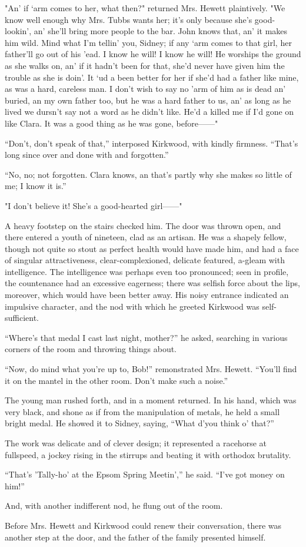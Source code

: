 {\protect\hypertarget{42}{}{}}"An' if `arm comes to her, what then?"
returned Mrs. Hewett plaintively. "We know well enough why Mrs. Tubbs
wants her; it's only because she's good-lookin', an' she'll bring more
people to the bar. John knows that, an' it makes him wild. Mind what I'm
tellin' you, Sidney; if any `arm comes to that girl, her father'll go
out of his 'ead. I know he will! I know he will! He worships the ground
as she walks on, an' if it hadn't been for that, she'd never have given
him the trouble as she is doin'. It `ud a been better for her if she'd
had a father like mine, as was a hard, careless man. I don't wish to say
no 'arm of him as is dead an' buried, an my own father too, but he was a
hard father to us, an' as long as he lived we dursn't say not a word as
he didn't like. He'd a killed me if I'd gone on like Clara. It was a
good thing as he was gone, before{{------}}"

``Don't, don't speak of that,'' interposed Kirkwood, with kindly
firmness. ``That's long since over and done with and forgotten.''

{\protect\hypertarget{43}{}{}}``No, no; not forgotten. Clara knows, an
that's partly why she makes so little of me; I know it is.''

"I don't believe it! She's a good-hearted girl{{------}}"

A heavy footstep on the stairs checked him. The door was thrown open,
and there entered a youth of nineteen, clad as an artisan. He was a
shapely fellow, though not quite so stout as perfect health would have
made him, and had a face of singular attractiveness, clear-complexioned,
delicate featured, a-gleam with intelligence. The intelligence was
perhaps even too pronounced; seen in profile, the countenance had an
excessive eagerness; there was selfish force about the lips, moreover,
which would have been better away. His noisy entrance indicated an
impulsive character, and the nod with which he greeted Kirkwood was
self-sufficient.

``Where's that medal I cast last night, mother?'' he asked, searching in
various corners of the room and throwing things about.

{\protect\hypertarget{44}{}{}}``Now, do mind what you're up to, Bob!''
remonstrated Mrs. Hewett. ``You'll find it on the mantel in the other
room. Don't make such a noise.''

The young man rushed forth, and in a moment returned. In his hand, which
was very black, and shone as if from the manipulation of metals, he held
a small bright medal. He showed it to Sidney, saying, ``What d'you think
o' that?''

The work was delicate and of clever design; it represented a racehorse
at fullspeed, a jockey rising in the stirrups and beating it with
orthodox brutality.

``That's 'Tally-ho' at the Epsom Spring Meetin','' he said. ``I've got
money on him!''

And, with another indifferent nod, he flung out of the room.

Before Mrs. Hewett and Kirkwood could renew their conversation, there
was another step at the door, and the father of the family presented
himself.
